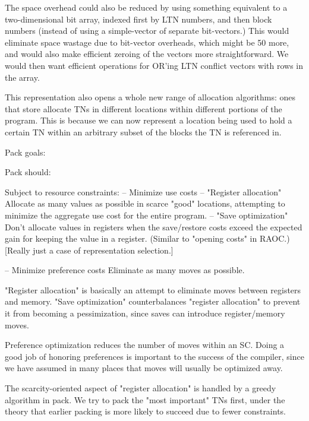 The space overhead could also be reduced by using something equivalent to a
two-dimensional bit array, indexed first by LTN numbers, and then block numbers
(instead of using a simple-vector of separate bit-vectors.)  This would
eliminate space wastage due to bit-vector overheads, which might be 50%
more, and would also make efficient zeroing of the vectors more
straightforward.  We would then want efficient operations for OR'ing LTN
conflict vectors with rows in the array.

This representation also opens a whole new range of allocation algorithms: ones
that store allocate TNs in different locations within different portions of the
program.  This is because we can now represent a location being used to hold a
certain TN within an arbitrary subset of the blocks the TN is referenced in.









Pack goals:

Pack should:

Subject to resource constraints:
 -- Minimize use costs
     -- "Register allocation"
         Allocate as many values as possible in scarce "good" locations,
         attempting to minimize the aggregate use cost for the entire program.
     -- "Save optimization"
         Don't allocate values in registers when the save/restore costs exceed
         the expected gain for keeping the value in a register.  (Similar to
         "opening costs" in RAOC.)  [Really just a case of representation
         selection.]

 -- Minimize preference costs
    Eliminate as many moves as possible.


"Register allocation" is basically an attempt to eliminate moves between
registers and memory.  "Save optimization" counterbalances "register
allocation" to prevent it from becoming a pessimization, since saves can
introduce register/memory moves.

Preference optimization reduces the number of moves within an SC.  Doing a good
job of honoring preferences is important to the success of the compiler, since
we have assumed in many places that moves will usually be optimized away.

The scarcity-oriented aspect of "register allocation" is handled by a greedy
algorithm in pack.  We try to pack the "most important" TNs first, under the
theory that earlier packing is more likely to succeed due to fewer constraints.

